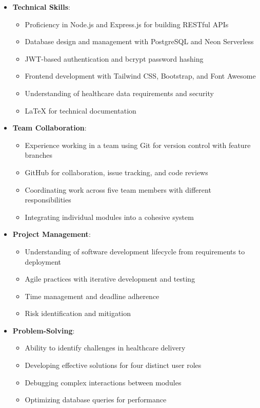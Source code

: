 \begin{itemize}
    \item \textbf{Technical Skills}:
    \begin{itemize}
        \item Proficiency in Node.js and Express.js for building RESTful APIs
        \item Database design and management with PostgreSQL and Neon Serverless
        \item JWT-based authentication and bcrypt password hashing
        \item Frontend development with Tailwind CSS, Bootstrap, and Font Awesome
        \item Understanding of healthcare data requirements and security
        \item LaTeX for technical documentation
    \end{itemize}
    
    \item \textbf{Team Collaboration}:
    \begin{itemize}
        \item Experience working in a team using Git for version control with feature branches
        \item GitHub for collaboration, issue tracking, and code reviews
        \item Coordinating work across five team members with different responsibilities
        \item Integrating individual modules into a cohesive system
    \end{itemize}
    
    \item \textbf{Project Management}:
    \begin{itemize}
        \item Understanding of software development lifecycle from requirements to deployment
        \item Agile practices with iterative development and testing
        \item Time management and deadline adherence
        \item Risk identification and mitigation
    \end{itemize}
    
    \item \textbf{Problem-Solving}:
    \begin{itemize}
        \item Ability to identify challenges in healthcare delivery
        \item Developing effective solutions for four distinct user roles
        \item Debugging complex interactions between modules
        \item Optimizing database queries for performance
    \end{itemize}
    

\end{itemize}
